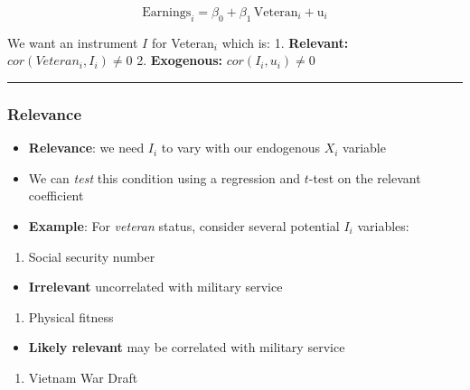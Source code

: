 \documentclass[
]{article}
\providecommand{\tightlist}{%
  \setlength{\itemsep}{0pt}\setlength{\parskip}{0pt}}
\begin{document}
\[\text{Earnings}_{i}=\beta_0+\beta_1 \, \text{Veteran}_{i}+\text{u}_{i}\]

We want an instrument \(I\) for Veteran\(_i\) which is: 1.
\textbf{Relevant:} \(cor(Veteran_i, I_i)\neq 0\) 2. \textbf{Exogenous:}
\(cor(I_i, u_i)\neq 0\)

\begin{center}\rule{0.5\linewidth}{0.5pt}\end{center}

\hypertarget{relevance}{%
\subsubsection{Relevance}\label{relevance}}

\begin{itemize}
\item
  \textbf{Relevance}: we need \(I_i\) to vary with our endogenous
  \(X_i\) variable
\item
  We can \emph{test} this condition using a regression and \(t\)-test on
  the relevant coefficient
\item
  \textbf{Example}: For \emph{veteran} status, consider several
  potential \(I_i\) variables:
\end{itemize}

\begin{enumerate}
\def\labelenumi{\arabic{enumi}.}
\tightlist
\item
  Social security number
\end{enumerate}

\begin{itemize}
\tightlist
\item
  \textbf{Irrelevant} uncorrelated with military service
\end{itemize}

\begin{enumerate}
\def\labelenumi{\arabic{enumi}.}
\setcounter{enumi}{1}
\tightlist
\item
  Physical fitness
\end{enumerate}

\begin{itemize}
\tightlist
\item
  \textbf{Likely relevant} may be correlated with military service
\end{itemize}

\begin{enumerate}
\def\labelenumi{\arabic{enumi}.}
\setcounter{enumi}{2}
\tightlist
\item
  Vietnam War Draft
\end{enumerate}
\end{document}
